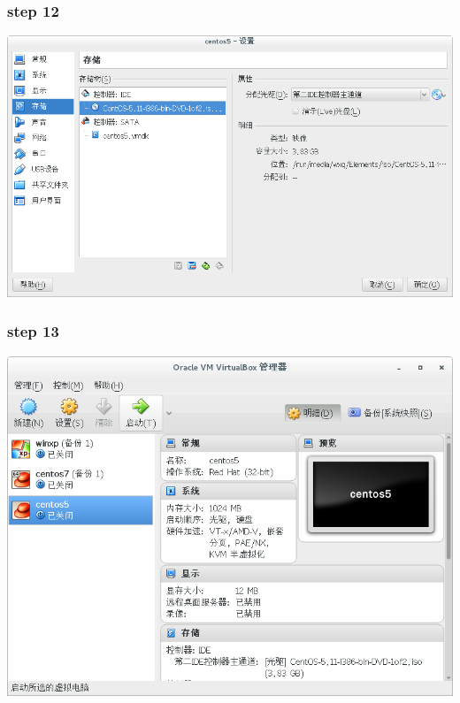 \documentclass[xcolor=svgnames,presentation]{beamer}
\begin{document}
\begin{frame}
\frametitle{step 12}
\label{sec-1-12}

\begin{center}
\includegraphics[width=.9\linewidth]{img/vb14.png}
\end{center}
\end{frame}
\begin{frame}
\frametitle{step 13}
\label{sec-1-13}

\begin{center}
\includegraphics[width=.9\linewidth]{img/vb15.png}
\end{center}
\end{frame}
\end{document}
